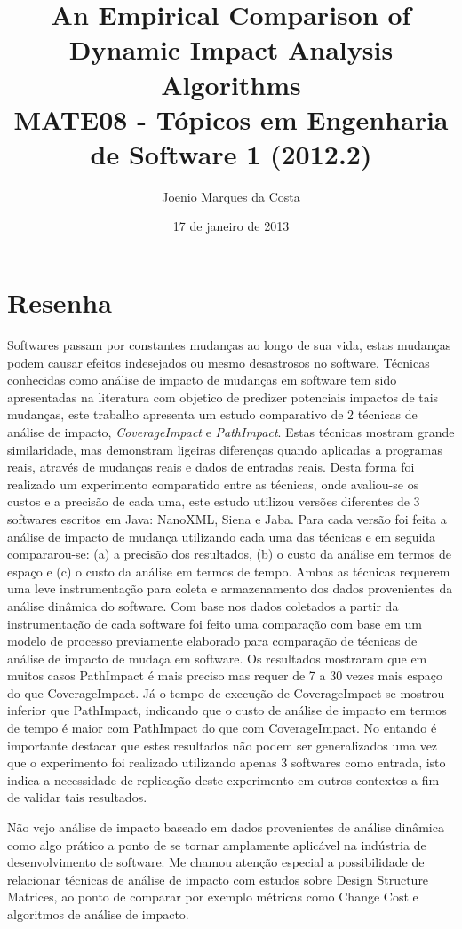 \documentclass[12pt]{article}
\title{An Empirical Comparison of Dynamic Impact Analysis Algorithms
 \cite{DynamicImpactAnalysis} \\
 \large MATE08 - Tópicos em Engenharia de Software 1 (2012.2)}
\author{Joenio Marques da Costa}
\date{17 de janeiro de 2013}
\begin{document}
\maketitle

\section*{Resenha}

Softwares passam por constantes mudanças ao longo de sua vida, estas mudanças
podem causar efeitos indesejados ou mesmo desastrosos no software.  Técnicas
conhecidas como análise de impacto de mudanças em software tem sido
apresentadas na literatura com objetico de predizer potenciais impactos de
tais mudanças, este trabalho apresenta um estudo comparativo de 2 técnicas de
análise de impacto, {\it CoverageImpact} e {\it PathImpact}. Estas técnicas
mostram grande similaridade, mas demonstram ligeiras diferenças quando
aplicadas a programas reais, através de mudanças reais e dados de entradas
reais. Desta forma foi realizado um experimento comparatido entre as técnicas,
onde avaliou-se os custos e a precisão de cada uma, este estudo utilizou
versões diferentes de 3 softwares escritos em Java: NanoXML, Siena e Jaba.
Para cada versão foi feita a análise de impacto de mudança utilizando cada uma
das técnicas e em seguida compararou-se: (a) a precisão dos resultados, (b) o
custo da análise em termos de espaço e (c) o custo da análise em termos de
tempo. Ambas as técnicas requerem uma leve instrumentação para coleta e
armazenamento dos dados provenientes da análise dinâmica do software. Com base
nos dados coletados a partir da instrumentação de cada software foi feito uma
comparação com base em um modelo de processo previamente elaborado para
comparação de técnicas de análise de impacto de mudaça em software. Os
resultados mostraram que em muitos casos PathImpact é mais preciso mas requer
de 7 a 30 vezes mais espaço do que CoverageImpact. Já o tempo de execução de
CoverageImpact se mostrou inferior que PathImpact, indicando que o custo de
análise de impacto em termos de tempo é maior com PathImpact do que com
CoverageImpact. No entando é importante destacar que estes resultados não
podem ser generalizados uma vez que o experimento foi realizado utilizando
apenas 3 softwares como entrada, isto indica a necessidade de replicação deste
experimento em outros contextos a fim de validar tais resultados.

Não vejo análise de impacto baseado em dados provenientes de análise dinâmica
como algo prático a ponto de se tornar amplamente aplicável na indústria de
desenvolvimento de software. Me chamou atenção especial a possibilidade de
relacionar técnicas de análise de impacto com estudos sobre Design Structure
Matrices, ao ponto de comparar por exemplo métricas como Change Cost e
algoritmos de análise de impacto.


\end{document}

